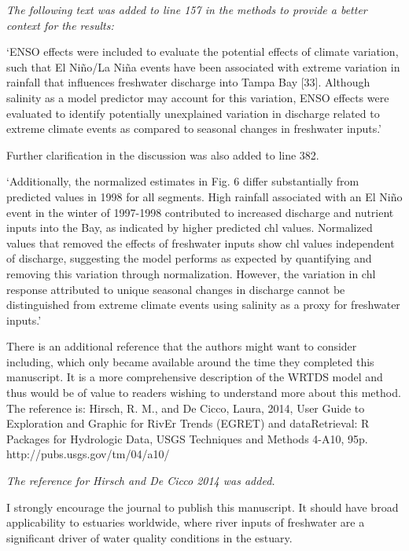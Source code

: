 \documentclass[letterpaper,12pt,oneside]{article}\usepackage[]{graphicx}\usepackage[]{color}
\begin{document}
{\it The following text was added to line 157 in the methods to provide a better context for the results:

`ENSO effects were included to evaluate the potential effects of climate variation, such that El Ni\~{n}o/La Ni\~{n}a events have been associated with extreme variation in rainfall that influences freshwater discharge into Tampa Bay [33].  Although salinity as a model predictor may account for this variation, ENSO effects were evaluated to identify potentially unexplained variation in discharge related to extreme climate events as compared to seasonal changes in freshwater inputs.'

Further clarification in the discussion was also added to line 382.

`Additionally, the normalized  estimates in Fig. 6 differ substantially from predicted values in 1998 for all segments.  High rainfall associated with an El Ni\~{n}o event in the winter of 1997-1998 contributed to increased discharge and nutrient inputs into the Bay, as indicated by higher predicted \ac{chl} values.  Normalized values that removed the effects of freshwater inputs show \ac{chl} values independent of discharge, suggesting the model performs as expected by quantifying and removing this variation through normalization.  However, the variation in \ac{chl} response attributed to unique seasonal changes in discharge cannot be distinguished from extreme climate events using salinity as a proxy for freshwater inputs.'
}

There is an additional reference that the authors might want to consider including, which only became available around the time they completed this manuscript.  It is a more comprehensive description of the WRTDS model and thus would be of value to readers wishing to understand more about this method.  The reference is:  Hirsch, R. M., and De Cicco, Laura, 2014, User Guide to Exploration and Graphic for RivEr Trends (EGRET) and dataRetrieval: R Packages for Hydrologic Data, USGS Techniques and Methods 4-A10, 95p.  http://pubs.usgs.gov/tm/04/a10/

{\it The reference for Hirsch and De Cicco 2014 was added.}

I strongly encourage the journal to publish this manuscript.  It should have broad applicability to estuaries worldwide, where river inputs of freshwater are a significant driver of water quality conditions in the estuary.
\end{document}
